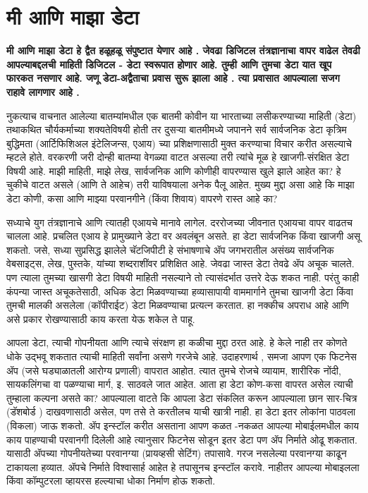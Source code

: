 \chapter{मी आणि माझा डेटा}

{\textbf{मी आणि माझा डेटा हे द्वैत हळूहळू संपुष्टात येणार आहे .  जेवढा डिजिटल तंत्रज्ञानाचा वापर वाढेल तेवढी आपल्याबद्दलची माहिती डिजिटल - डेटा स्वरूपात होणार आहे. तुम्ही आणि तुमचा डेटा  यात खूप फारकत नसणार आहे. जणू डेटा-अद्वैताचा प्रवास सुरू झाला आहे .  त्या प्रवासात आपल्याला सजग राहावे लागणार आहे . }}

नुकत्याच वाचनात आलेल्या बातम्यांमधील एक बातमी कोवीन या भारताच्या लसीकरण्याच्या माहिती (डेटा) तथाकथित चौर्यकर्माच्या शक्यतेविषयी होती तर दुसऱ्या बातमीमध्ये जपानने सर्व सार्वजनिक डेटा कृत्रिम बुद्धिमता (आर्टिफिशिअल इंटेलिजन्स, एआय) च्या प्रशिक्षणासाठी मुक्त करण्याचा विचार करीत असल्याचे म्हटले होते. वरकरणी जरी दोन्ही बातम्या वेगळ्या वाटत असल्या तरी त्यांचे मूळ हे खाजगी-संरक्षित डेटा विषयी आहे. माझी माहिती, माझे लेख, सार्वजनिक आणि कोणीही वापरण्यास खुले झाले आहेत का? हे चुकीचे वाटत असले (आणि ते आहेच) तरी याविषयाला अनेक पैलू आहेत. मुख्य मुद्दा असा आहे कि माझा डेटा कोणी, कसा आणि माझ्या परवानगीने (किंवा शिवाय) वापरणे रास्त आहे का?

सध्याचे युग तंत्रज्ञानाचे आणि त्यातही एआयचे मानावे लागेल. दररोजच्या जीवनात एआयचा वापर वाढतच चालला आहे. प्रचलित एआय हे प्रामुख्याने डेटा वर अवलंबून असते. हा डेटा सार्वजनिक किंवा खाजगी असू शकतो. जसे, सध्या सुप्रसिद्ध झालेले चॅटजिपीटी हे संभाषणाचे ॲप जगभरातील असंख्य सार्वजनिक वेबसाइट्स, लेख, पुस्तके, यांच्या शब्दराशींवर प्रशिक्षित आहे. जेवढा जास्त डेटा तेवढे ॲप अचूक चालते. पण त्याला तुमच्या खासगी डेटा विषयी माहिती नसल्याने तो त्यासंदर्भात उत्तरे देऊ शकत नाही. परंतु काही कंपन्या जास्त अचूकतेसाठी, अधिक डेटा मिळवण्याच्या हव्यासापायी वाममार्गाने तुमचा खाजगी डेटा किंवा तुमची मालकी असलेला (कॉपीराईट) डेटा मिळवण्याचा प्रत्यत्न करतात. हा नक्कीच अपराध आहे आणि असे प्रकार रोखण्यासाठी काय करता येऊ शकेल ते पाहू.

आपला डेटा, त्याची गोपनीयता आणि त्याचे संरक्षण हा कळीचा मुद्दा ठरत आहे. हे केले नाही तर कोणते धोके उद्भवू शकतात त्याची माहिती सर्वांना असणे गरजेचे आहे. उदाहरणार्थ , समजा आपण एक फिटनेस ॲप (जसे घड्याळातली आरोग्य प्रणाली) वापरात आहोत. त्यात तुमचे रोजचे व्यायाम, शारीरिक नोंदी, सायकलिंगचा वा पळण्याचा मार्ग, इ. साठवले जात आहेत. आता हा डेटा कोण-कसा वापरत असेल त्याची तुम्हाला कल्पना असते का? आपल्याला वाटते कि आपला डेटा संकलित करून आपल्याला छान सार-चित्र (डॅशबोर्ड ) दाखवणासाठी असेल, पण तसे ते करतीलच याची खात्री नाही. हा डेटा इतर लोकांना पाठवला (विकला) जाऊ शकतो. ॲप इन्स्टॉल करीत असताना आपण कळत -नकळत आपल्या मोबाईलमधील काय काय पाहण्याची परवानगी दिलेली आहे त्यानुसार फिटनेस सोडून इतर डेटा पण ॲप निर्माते ओढू शकतात. यासाठी ॲपच्या गोपनीयतेच्या परवानग्या (प्रायव्हसी सेटिंग) तपासावे. गरज नसलेल्या परवानग्या काढून टाकायला हव्यात. ॲपचे निर्माते विश्वासार्ह आहेत हे तपासूनच इन्स्टॉल करावे. नाहीतर आपल्या मोबाइलला किंवा कॉम्पुटरला व्हायरस हल्ल्याचा धोका निर्माण होऊ शकतो.


